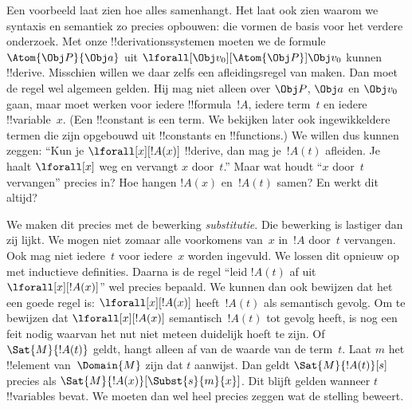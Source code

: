 \documentclass[openany]{memoir}
\begin{document}
\begingroup
\def\olfilename{OLP-0146}
\def\olfilepath{content/first-order-logic/introduction/}
\hypertarget{unit-OLP-0146}{}





Een voorbeeld laat zien hoe alles samenhangt. Het laat ook zien waarom
we syntaxis en semantiek zo precies opbouwen: die vormen de basis voor
het verdere onderzoek. Met onze !!{derivation}ssystemen moeten we de
formule $\Atom{\Obj P}{\Obj a}$ uit
$\lforall[\Obj v_0][\Atom{\Obj P}]{\Obj v_0}$ kunnen !!{derive}. Misschien willen we daar zelfs een
afleidingsregel van maken. Dan moet de regel wel algemeen gelden. Hij
mag niet alleen over $\Obj P$, $\Obj a$ en $\Obj v_0$ gaan, maar moet
werken voor iedere !!{formula}~$!A$, iedere term~$t$ en iedere
!!{variable}~$x$. (Een !!{constant} is een term. We bekijken later ook
ingewikkeldere termen die zijn opgebouwd uit !!{constant}s en
!!{function}s.) We willen dus kunnen zeggen: ``Kun je
$\lforall[x][!A(x)]$ !!{derive}, dan mag je~$!A(t)$ afleiden. Je haalt
$\lforall[x]$ weg en vervangt $x$ door~$t$.'' Maar wat houdt
``$x$ door~$t$ vervangen'' precies in? Hoe hangen $!A(x)$ en~$!A(t)$
samen? En werkt dit altijd?

We maken dit precies met de bewerking \emph{substitutie}. Die bewerking
is lastiger dan zij lijkt. We mogen niet zomaar alle voorkomens van~$x$
in~$!A$ door~$t$ vervangen. Ook mag niet iedere~$t$ voor iedere~$x$
worden ingevuld. We lossen dit opnieuw op met inductieve definities.
Daarna is de regel ``leid $!A(t)$ af uit $\lforall[x][!A(x)]$'' wel
precies bepaald. We kunnen dan ook bewijzen dat het een goede regel is:
$\lforall[x][!A(x)]$ heeft~$!A(t)$ als semantisch gevolg.
Om te bewijzen dat $\lforall[x][!A(x)]$ semantisch~$!A(t)$ tot gevolg
heeft, is nog een feit nodig waarvan het nut niet meteen duidelijk
hoeft te zijn. Of $\Sat{M}{!A(t)}$ geldt, hangt alleen af van
de waarde van de term~$t$. Laat $m$ het !!{element} van~$\Domain{M}$
zijn dat $t$ aanwijst. Dan geldt $\Sat{M}{!A(t)}[s]$ precies als
$\Sat{M}{!A(x)}[\Subst{s}{m}{x}]$. Dit blijft gelden wanneer $t$
!!{variable}s bevat. We moeten dan wel heel precies zeggen wat de
stelling beweert.
\endgroup
\end{document}
